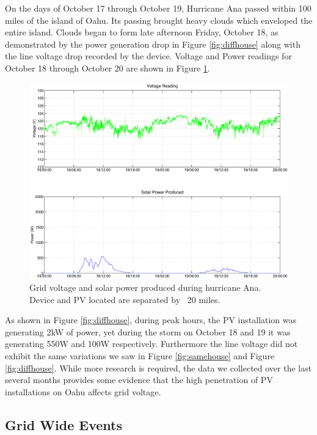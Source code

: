 On the days of October 17 through October 19, Hurricane Ana passed within 100 miles of the island of Oahu. Its passing brought heavy clouds which enveloped the entire island. Clouds began to form late afternoon Friday, October 18, as demonstrated by the power generation drop in Figure \ref{fig:diffhouse} along with the line voltage drop recorded by the device. Voltage and Power readings for October 18 through October 20 are shown in Figure \ref{fig:storm}.

\begin{figure}[h!]
\centering
\includegraphics[width=\textwidth]{img/Stormy.eps}
\caption{Grid voltage and solar power produced during hurricane Ana. Device and PV located are separated by ~20 miles.}
\label{fig:storm}
\end{figure} 

As shown in Figure \ref{fig:diffhouse}, during peak hours, the PV installation was generating 2kW of power, yet during the storm on October 18 and 19 it was generating 550W and 100W respectively. Furthermore the line voltage did not exhibit the same variations we saw in Figure \ref{fig:samehouse} and Figure \ref{fig:diffhouse}. While more research is required, the data we collected over the last several months provides some evidence that the high penetration of PV installations on Oahu affects grid voltage. 

\subsection{Grid Wide Events}

